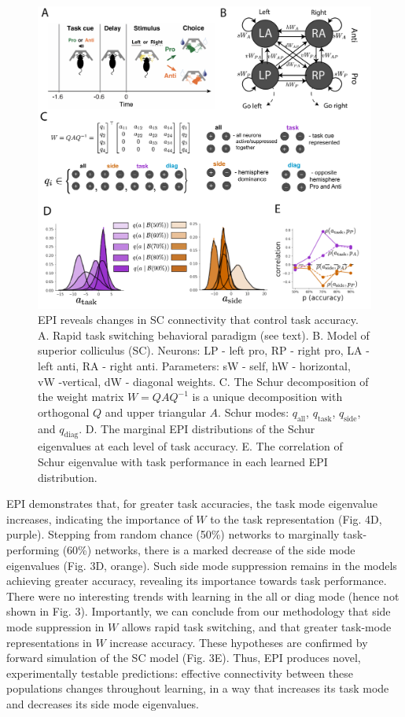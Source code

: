 \documentclass[11pt]{article}
\begin{document}
\begin{figure}
\begin{center}
\includegraphics[scale=0.5]{figures/fig4/fig4.pdf}
\end{center}
\caption{EPI reveals changes in SC \cite{duan2018collicular} connectivity that control task accuracy.  A. Rapid task switching behavioral paradigm (see text). B. Model of superior colliculus (SC). Neurons: LP - left pro, RP - right pro, LA - left anti, RA - right anti.  Parameters: sW - self, hW - horizontal, vW -vertical, dW - diagonal weights. C. The Schur decomposition of the weight matrix $W = QAQ^{-1}$ is a unique decomposition with orthogonal $Q$ and upper triangular $A$. Schur modes: $q_{\text{all}}$, $q_{\text{task}}$, $q_{\text{side}}$, and $q_{\text{diag}}$.  D. The marginal EPI distributions of the Schur eigenvalues at each level of task accuracy. E. The correlation of Schur eigenvalue with task performance in each learned EPI distribution.}
\end{figure}

EPI demonstrates that, for greater task accuracies, the task mode eigenvalue increases, indicating the importance of $W$ to the task representation (Fig. 4D, purple).  Stepping from random chance (50\%) networks to marginally task-performing (60\%) networks, there is a marked decrease of the side mode eigenvalues (Fig. 3D, orange).  Such side mode suppression remains in the models achieving greater accuracy, revealing its importance towards task performance.   There were no interesting trends with learning in the all or diag mode (hence not shown in Fig. 3). Importantly, we can conclude from our methodology that side mode suppression in $W$ allows rapid task switching, and that greater task-mode representations in $W$ increase accuracy.  These hypotheses are confirmed by forward simulation of the SC model (Fig. 3E).  Thus, EPI produces novel, experimentally testable predictions: effective connectivity between these populations changes throughout learning, in a way that increases its task mode and decreases its side mode eigenvalues.
\end{document}
